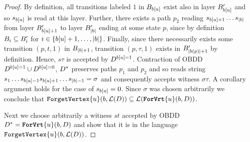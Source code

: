 \begin{proof}
    By definition, all transitions labeled $1$ in $B_{b[u]}$ exist also in layer $B_{b[u]}'$ and so $s_{b[u]}$ is read at this layer. Further, there exists a path $p_2$ reading $s_{b[u]+1}\dots s_{|b|}$ from layer $B_{b[u]+1}'$ to layer $B_{|b|}'$ ending at some state $p$, since by definition $B_i \subseteq B_i'$ for $i \in \{b[u]+1,\ldots,|b|\}$. Finally, since there necessarily exists some transition $(p,t,1)$ in $B_{|b|+1}$, transition $(p,\tau,1)$ exists in $B_{|b(p)|+1}'$ by definition. Hence, $s\tau$ is accepted by $D^{b[u]=1}$. Contraction of OBDD $D^{b[u]=1} \cup D^{b[u]=0}$, $D^*$ preserves paths $p_1$ and $p_2$ and so reads string $s_1\dots s_{b[u]-1} s_{b[u]+1}\dots s_{|b|-1} = \sigma$ and consequently accepts witness $\sigma\tau$. A corollary argument holds for the case of $s_{b[u]} = 0$. Since $\sigma$ was chosen arbitrarily we conclude that $\texttt{ForgetVertex}\{u\}(b,\mathcal{L}(D)) \subseteq \mathcal{L}(\texttt{\textbf{ForVrt}}\{u\}(b,D))$.

    Next we choose arbitrarily a witness $st$ accepted by OBDD $D^* = \texttt{\textbf{ForVrt}}\{u\}(b,D)$ and show that it is in the language $\texttt{ForgetVertex}\{u\}(b,\mathcal{L}(D))$. 



\end{proof}
